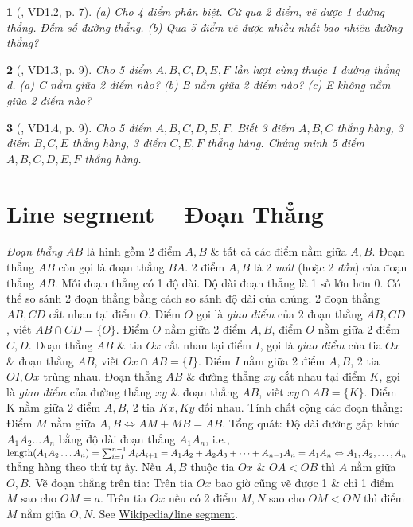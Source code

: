 \documentclass{article}
\newtheorem{baitoan}{}
\begin{document}
\begin{baitoan}[\cite{TLCT_THCS_Toan_6_hinh_hoc}, VD1.2, p. 7]
	(a) Cho 4 điểm phân biệt. Cứ qua 2 điểm, vẽ được 1 đường thẳng. Đếm số đường thẳng. (b) Qua 5 điểm vẽ được nhiều nhất bao nhiêu đường thẳng?
\end{baitoan}

\begin{baitoan}[\cite{TLCT_THCS_Toan_6_hinh_hoc}, VD1.3, p. 9]
	Cho 5 điểm $A,B,C,D,E,F$ lần lượt cùng thuộc 1 đường thẳng d. (a) C nằm giữa 2 điểm nào? (b) B nằm giữa 2 điểm nào? (c) E không nằm giữa 2 điểm nào?
\end{baitoan}

\begin{baitoan}[\cite{TLCT_THCS_Toan_6_hinh_hoc}, VD1.4, p. 9]
	Cho 5 điểm $A,B,C,D,E,F$. Biết 3 điểm $A,B,C$ thẳng hàng, 3 điểm $B,C,E$ thẳng hàng, 3 điểm $C,E,F$ thẳng hàng. Chứng minh 5 điểm $A,B,C,D,E,F$ thẳng hàng.
\end{baitoan}


\section{Line segment -- Đoạn Thẳng}
 \textit{Đoạn thẳng} $AB$ là hình gồm 2 điểm $A,B$ \& tất cả các điểm nằm giữa $A,B$. Đoạn thẳng $AB$ còn gọi là đoạn thẳng $BA$. 2 điểm $A,B$ là 2 \textit{mút} (hoặc 2 \textit{đầu}) của đoạn thẳng $AB$. Mỗi đoạn thẳng có 1 độ dài. Độ dài đoạn thẳng là 1 số lớn hơn $0$.  Có thể so sánh 2 đoạn thẳng bằng cách so sánh độ dài của chúng.  2 đoạn thẳng $AB,CD$ cắt nhau tại điểm $O$. Điểm $O$ gọi là \textit{giao điểm} của 2 đoạn thẳng $AB,CD$, viết $AB\cap CD = \{O\}$. Điểm $O$ nằm giữa 2 điểm $A,B$, điểm $O$ nằm giữa 2 điểm $C,D$.  Đoạn thẳng $AB$ \& tia $Ox$ cắt nhau tại điểm $I$, gọi là \textit{giao điểm} của tia $Ox$ \& đoạn thẳng $AB$, viết $Ox\cap AB = \{I\}$. Điểm $I$ nằm giữa 2 điểm $A,B$, 2 tia $OI,Ox$ trùng nhau.  Đoạn thẳng $AB$ \& đường thẳng $xy$ cắt nhau tại điểm $K$, gọi là \textit{giao điểm} của đường thẳng $xy$ \& đoạn thẳng $AB$, viết $xy\cap AB = \{K\}$. Điểm K nằm giữa 2 điểm $A,B$, 2 tia $Kx,Ky$ đối nhau.  {\sf Tính chất cộng các đoạn thẳng}: Điểm $M$ nằm giữa $A,B\Leftrightarrow AM + MB = AB$. Tổng quát: Độ dài đường gấp khúc $A_1A_2\ldots A_n$ bằng độ dài đoạn thẳng $A_1A_n$, i.e., ${\rm length}(A_1A_2\ldots A_n) = \sum_{i=1}^{n-1} A_iA_{i+1} = A_1A_2 + A_2A_3 + \cdots + A_{n-1}A_n = A_1A_n\Leftrightarrow A_1,A_2,\ldots,A_n$ thẳng hàng theo thứ tự ấy. Nếu $A,B$ thuộc tia $Ox$ \& $OA < OB$ thì $A$ nằm giữa $O,B$.  {\sf Vẽ đoạn thẳng trên tia}: Trên tia $Ox$ bao giờ cũng vẽ được 1 \& chỉ 1 điểm $M$ sao cho $OM = a$. Trên tia $Ox$ nếu có 2 điểm $M,N$ sao cho $OM < ON$ thì điểm $M$ nằm giữa $O,N$. See \href{https://en.wikipedia.org/wiki/Line_segment}{Wikipedia{\tt/}line segment}.
\end{document}
